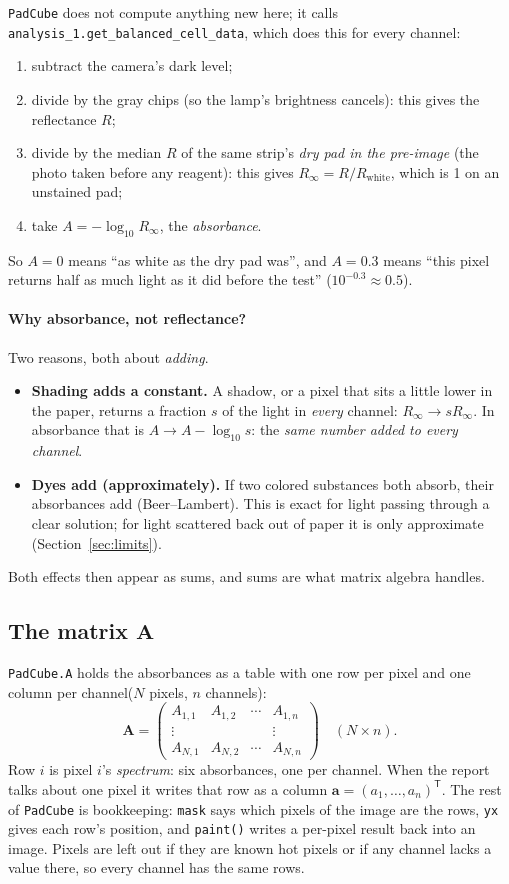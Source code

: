 \documentclass[11pt,letterpaper]{article}
\newcommand{\code}[1]{\texttt{#1}}
\newcommand{\va}{\mathbf{a}}
\newcommand{\mA}{\mathbf{A}}
\newcommand{\T}{^{\mathsf{T}}}
\begin{document}
\code{PadCube} does not compute anything new here; it calls
\code{analysis\_1.get\_balanced\_cell\_data}, which does this for every
channel:
\begin{enumerate}[nosep]
\item subtract the camera's dark level;
\item divide by the gray chips (so the lamp's brightness cancels):
  this gives the reflectance $R$;
\item divide by the median $R$ of the same strip's \emph{dry pad in the
  pre-image} (the photo taken before any reagent): this gives
  $R_\infty = R / R_\text{white}$, which is 1 on an unstained pad;
\item take $A = -\log_{10} R_\infty$, the \emph{absorbance}.
\end{enumerate}
So $A = 0$ means ``as white as the dry pad was'', and $A = 0.3$ means ``this
pixel returns half as much light as it did before the test''
($10^{-0.3} \approx 0.5$).

\paragraph{Why absorbance, not reflectance?}  Two reasons, both about
\emph{adding}.
\begin{itemize}[nosep]
\item \textbf{Shading adds a constant.}  A shadow, or a pixel that sits a
  little lower in the paper, returns a fraction $s$ of the light in
  \emph{every} channel: $R_\infty \to s R_\infty$.  In absorbance that is
  $A \to A - \log_{10} s$: the \emph{same number added to every channel}.
\item \textbf{Dyes add (approximately).}  If two colored substances both
  absorb, their absorbances add (Beer--Lambert).  This is exact for light
  passing through a clear solution; for light scattered back out of paper it
  is only approximate (Section~\ref{sec:limits}).
\end{itemize}
Both effects then appear as sums, and sums are what matrix algebra handles.

\subsection{The matrix $\mA$}

\code{PadCube.A} holds the absorbances as a table with one row per pixel and
one column per channel($N$ pixels, $n$ channels):
\[
\mA = \begin{pmatrix}
A_{1,1} & A_{1,2} & \cdots & A_{1,n}\\
\vdots  &         &        & \vdots \\
A_{N,1} & A_{N,2} & \cdots & A_{N,n}
\end{pmatrix}
\quad (N \times n).
\]
Row $i$ is pixel $i$'s \emph{spectrum}: six absorbances, one per channel.
When the report talks about one pixel it writes that row as a column
$\va = (a_1, \dots, a_n)\T$.  The rest of \code{PadCube} is bookkeeping:
\code{mask} says which pixels of the image are the rows, \code{yx} gives
each row's position, and \code{paint()} writes a per-pixel result back into
an image.  Pixels are left out if they are known hot pixels or if any
channel lacks a value there, so every channel has the same rows.
\end{document}
